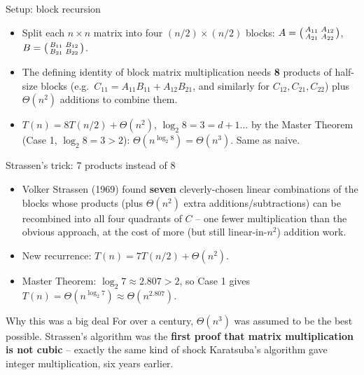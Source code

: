 \documentclass[11pt,aspectratio=169]{beamer}
\begin{document}
\begin{frame}{Setup: block recursion}
  \begin{itemize}
    \item Split each $n\times n$ matrix into four $(n/2)\times(n/2)$ blocks:
    $A = \begin{psmallmatrix} A_{11} & A_{12} \\ A_{21} & A_{22} \end{psmallmatrix}$,
    $B = \begin{psmallmatrix} B_{11} & B_{12} \\ B_{21} & B_{22} \end{psmallmatrix}$.
    \item The defining identity of block matrix multiplication needs \textbf{8} products
    of half-size blocks (e.g.\ $C_{11} = A_{11}B_{11} + A_{12}B_{21}$, and similarly for
    $C_{12}, C_{21}, C_{22}$) plus $\Theta(n^2)$ additions to combine them.
    \item $T(n) = 8T(n/2) + \Theta(n^2)$, $\log_2 8 = 3 = d+1$... by the Master Theorem
    (Case 1, $\log_2 8 = 3 > 2$): $\Theta(n^{\log_2 8}) = \Theta(n^3)$. Same as naive.
  \end{itemize}
\end{frame}

\begin{frame}{Strassen's trick: 7 products instead of 8}
  \begin{itemize}
    \item Volker Strassen (1969) found \textbf{seven} cleverly-chosen linear combinations
    of the blocks whose products (plus $\Theta(n^2)$ extra additions/subtractions) can be
    recombined into all four quadrants of $C$ -- one fewer multiplication than the obvious
    approach, at the cost of more (but still linear-in-$n^2$) addition work.
    \item New recurrence: $T(n) = 7T(n/2) + \Theta(n^2)$.
    \item Master Theorem: $\log_2 7 \approx 2.807 > 2$, so Case 1 gives
    $T(n) = \Theta\!\left(n^{\log_2 7}\right) \approx \Theta(n^{2.807})$.
  \end{itemize}
  \begin{alertblock}{Why this was a big deal}
    For over a century, $\Theta(n^3)$ was assumed to be the best possible. Strassen's
    algorithm was the \textbf{first proof that matrix multiplication is not
    cubic} -- exactly the same kind of shock Karatsuba's algorithm gave integer
    multiplication, six years earlier.
  \end{alertblock}
\end{frame}
\end{document}

